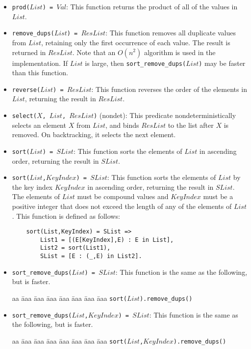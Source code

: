 \begin{itemize}
\item \texttt{prod($List$) = $Val$}: This function returns the product of all of the values in $List$. 
\item \texttt{remove\_dups($List$) = $ResList$}: This function removes all duplicate values from $List$, retaining only the first occurrence of each value.  The result is returned in $ResList$. Note that an $O(n^2)$ algorithm is used in the implementation. If $List$ is large, then \texttt{sort\_remove\_dups($List$)} may be faster than this function.
\item \texttt{reverse($List$) = $ResList$}: This function reverses the order of the elements in $List$, returning the result in $ResList$. 
\item \texttt{select($X$, $List$, $ResList$)} (nondet): This predicate nondeterministically selects an element $X$ from $List$, and binds $ResList$ to the list after $X$ is removed. On backtracking, it selects the next element.
\item \texttt{sort($List$) = $SList$}: This function sorts the elements of $List$ in ascending order, returning the result in $SList$. 
\item \texttt{sort($List$,$KeyIndex$) = $SList$}: This function sorts the elements of $List$ by the key index $KeyIndex$ in ascending order, returning the result in $SList$. The elements of $List$ must be compound values and $KeyIndex$ must be a positive integer that does not exceed the length of any of the elements of $List$. This function is defined as follows:
\begin{verbatim}
    sort(List,KeyIndex) = SList =>
        List1 = [(E[KeyIndex],E) : E in List],
        List2 = sort(List1),
        SList = [E : (_,E) in List2].
\end{verbatim}

\item \texttt{sort\_remove\_dups($List$) = $SList$}: This function is the same as the following, but is faster.
\begin{tabbing}
aa \= aaa \= aaa \= aaa \=aaa \= aaa \= aaa \= aaa \kill
\> \texttt{sort($List$).remove\_dups()}
\end{tabbing}

\item \texttt{sort\_remove\_dups($List$,$KeyIndex$) = $SList$}: This function is the same as the following, but is faster.
\begin{tabbing}
aa \= aaa \= aaa \= aaa \=aaa \= aaa \= aaa \= aaa \kill
\> \texttt{sort($List$,$KeyIndex$).remove\_dups()}
\end{tabbing}


\end{itemize}
